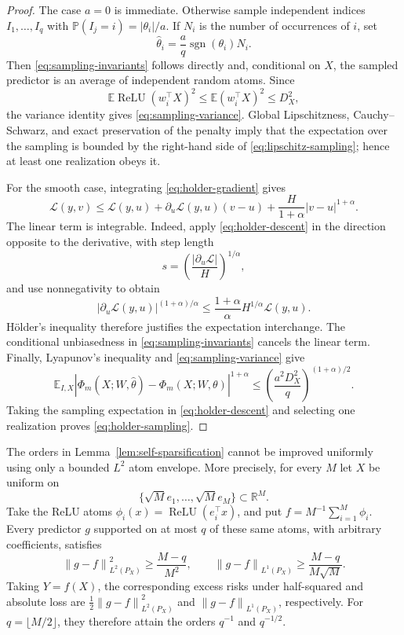 \documentclass[smallextended,envcountsect]{svjour3}
\newcommand{\relu}{\operatorname{ReLU}}
\newcommand{\E}{\mathbb{E}}
\newcommand{\R}{\mathbb{R}}
\newcommand{\norm}[1]{\left\lVert #1 \right\rVert}
\newcommand{\abs}[1]{\left\lvert #1 \right\rvert}
\begin{document}
\begin{proof}
The case $a=0$ is immediate.  Otherwise sample independent indices
$I_1,\ldots,I_q$ with
$\mathbb P(I_j=i)=\abs{\theta_i}/a$.  If $N_i$ is the number of occurrences
of $i$, set
\[
 \widehat\theta_i=\frac aq\operatorname{sgn}(\theta_i)N_i.
\]
Then \eqref{eq:sampling-invariants} follows directly and, conditional on $X$,
the sampled predictor is an average of independent random atoms.  Since
\[
 \E\relu(w_i^\top X)^2\le \E(w_i^\top X)^2\le D_X^2,
\]
the variance identity gives \eqref{eq:sampling-variance}.  Global
Lipschitzness, Cauchy--Schwarz, and exact preservation of the penalty imply
that the expectation over the sampling is bounded by the right-hand side of
\eqref{eq:lipschitz-sampling}; hence at least one realization obeys it.

For the smooth case, integrating \eqref{eq:holder-gradient} gives
\begin{equation}
 \mathcal L(y,v)\le \mathcal L(y,u)
 +\partial_u\mathcal L(y,u)(v-u)
 +\frac{H}{1+\alpha}\abs{v-u}^{1+\alpha}.
 \label{eq:holder-descent}
\end{equation}
The linear term is integrable. Indeed, apply \eqref{eq:holder-descent} in the
direction opposite to the derivative, with step length
\[
 s=\left(\frac{\abs{\partial_u\mathcal L}}{H}\right)^{1/\alpha},
\]
and use nonnegativity to obtain
\[
 \abs{\partial_u\mathcal L(y,u)}^{(1+\alpha)/\alpha}
 \le \frac{1+\alpha}{\alpha}H^{1/\alpha}\mathcal L(y,u).
\]
H\"older's inequality therefore justifies the expectation interchange.  The
conditional unbiasedness in \eqref{eq:sampling-invariants} cancels the linear
term.  Finally, Lyapunov's inequality and \eqref{eq:sampling-variance} give
\[
 \E_{I,X}\abs{\Phi_m(X;W,\widehat\theta)
 -\Phi_m(X;W,\theta)}^{1+\alpha}
 \le \left(\frac{a^2D_X^2}{q}\right)^{(1+\alpha)/2}.
\]
Taking the sampling expectation in \eqref{eq:holder-descent} and selecting one
realization proves \eqref{eq:holder-sampling}.
\end{proof}

\begin{proposition}\label{prop:compression-sharpness}
The orders in Lemma~\ref{lem:self-sparsification} cannot be improved uniformly
using only a bounded $L^2$ atom envelope.  More precisely, for every $M$ let
$X$ be uniform on
\[
 \{\sqrt M e_1,\ldots,\sqrt M e_M\}\subset\R^M.
\]
Take the ReLU atoms $\phi_i(x)=\relu(e_i^\top x)$, and put
$f=M^{-1}\sum_{i=1}^M\phi_i$.  Every predictor $g$ supported on at most $q$
of these same atoms, with arbitrary coefficients, satisfies
\begin{equation}
 \norm{g-f}_{L^2(P_X)}^2\ge\frac{M-q}{M^2},
 \qquad
 \norm{g-f}_{L^1(P_X)}\ge\frac{M-q}{M\sqrt M}.
 \label{eq:fixed-dictionary-lower}
\end{equation}
Taking $Y=f(X)$, the corresponding excess risks under half-squared and absolute
loss are $\frac12\norm{g-f}_{L^2(P_X)}^2$ and
$\norm{g-f}_{L^1(P_X)}$, respectively.  For $q=\lfloor M/2\rfloor$, they
therefore attain the orders $q^{-1}$ and $q^{-1/2}$.
\end{proposition}
\end{document}
